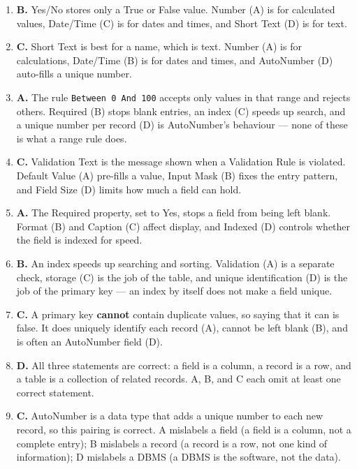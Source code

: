 \begin{enumerate}[label=\textbf{Q\arabic*.}, leftmargin=*]
\item \textbf{B.} Yes/No stores only a True or False value. Number (A) is for
  calculated values, Date/Time (C) is for dates and times, and Short Text (D)
  is for text.
\item \textbf{C.} Short Text is best for a name, which is text. Number (A)
  is for calculations, Date/Time (B) is for dates and times, and AutoNumber
  (D) auto-fills a unique number.
\item \textbf{A.} The rule \texttt{Between 0 And 100} accepts only values in
  that range and rejects others. Required (B) stops blank entries, an index
  (C) speeds up search, and a unique number per record (D) is AutoNumber's
  behaviour --- none of these is what a range rule does.
\item \textbf{C.} Validation Text is the message shown when a Validation Rule
  is violated. Default Value (A) pre-fills a value, Input Mask (B) fixes the
  entry pattern, and Field Size (D) limits how much a field can hold.
\item \textbf{A.} The Required property, set to Yes, stops a field from being
  left blank. Format (B) and Caption (C) affect display, and Indexed (D)
  controls whether the field is indexed for speed.
\item \textbf{B.} An index speeds up searching and sorting. Validation (A) is
  a separate check, storage (C) is the job of the table, and unique
  identification (D) is the job of the primary key --- an index by itself
  does not make a field unique.
\item \textbf{C.} A primary key \textbf{cannot} contain duplicate values, so
  saying that it can is false. It does uniquely identify each record (A),
  cannot be left blank (B), and is often an AutoNumber field (D).
\item \textbf{D.} All three statements are correct: a field is a column, a
  record is a row, and a table is a collection of related records. A, B, and
  C each omit at least one correct statement.
\item \textbf{C.} AutoNumber is a data type that adds a unique number to each
  new record, so this pairing is correct. A mislabels a field (a field is a
  column, not a complete entry); B mislabels a record (a record is a row, not
  one kind of information); D mislabels a DBMS (a DBMS is the software, not
  the data).


\end{enumerate}
